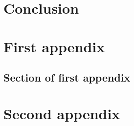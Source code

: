 \documentclass{mproj}
\begin{document}
\chapter{Conclusion}\label{conclusion}

\appendix %
\chapter{First appendix}

\section{Section of first appendix}

\chapter{Second appendix}

\printbibliography
\end{document}
